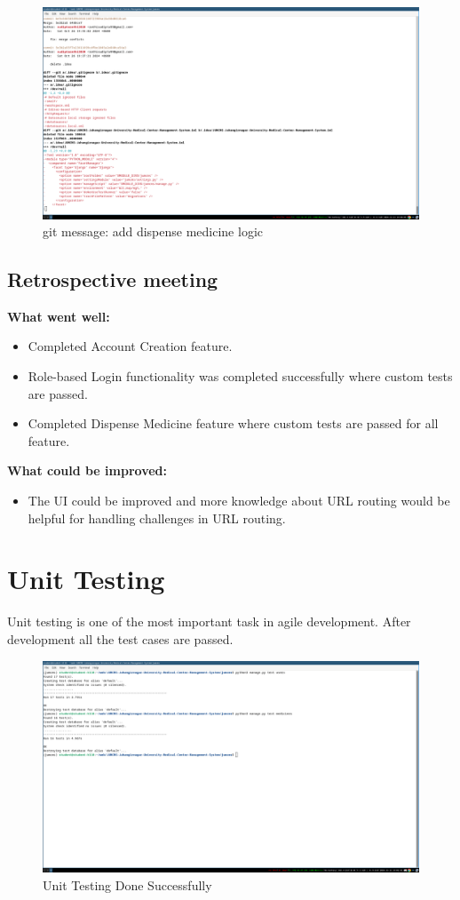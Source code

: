 \documentclass[a4paper,12pt]{article}
\begin{document}
\begin{figure}[H]
    \centering
    \includegraphics[width=\textwidth]{images/spr1meet39.png}
    \caption{git message: add dispense medicine logic}
\end{figure}
\newpage
\subsection{Retrospective meeting}
\textbf{What went well:}
\begin{itemize}
    \item Completed Account Creation feature.
    \item Role-based Login functionality was completed successfully where custom tests are passed.
    \item Completed Dispense Medicine feature where custom tests are passed for all feature.
\end{itemize}
\textbf{What could be improved:}
\begin{itemize}
    \item The UI could be improved and more knowledge about URL routing would be helpful for handling challenges in URL routing.
\end{itemize}
\newpage

\section{Unit Testing}
Unit testing is one of the most important task in agile development. After development all the test cases are
passed.
\begin{figure}[H]
    \centering
    \includegraphics[width=\textwidth]{images/unittesting.png}
    \caption{Unit Testing Done Successfully}
\end{figure}
\newpage
\end{document}

